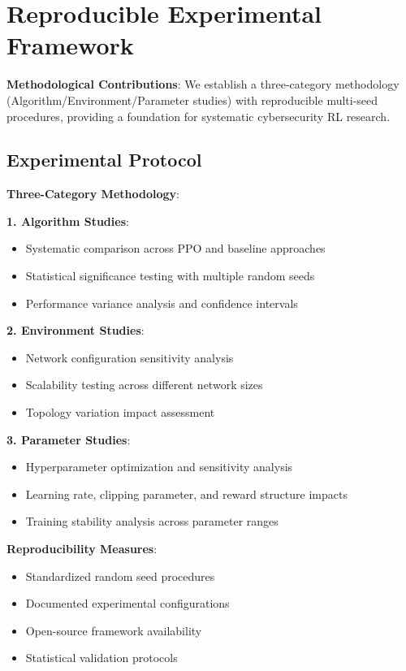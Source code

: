 \documentclass[11pt]{article}
\begin{document}
\section{Reproducible Experimental Framework}

\begin{research}
\textbf{Methodological Contributions}: We establish a three-category methodology (Algorithm/Environment/Parameter studies) with reproducible multi-seed procedures, providing a foundation for systematic cybersecurity RL research.
\end{research}

\subsection{Experimental Protocol}

\begin{mathdetails}
\textbf{Three-Category Methodology}:

\textbf{1. Algorithm Studies}:
\begin{itemize}
\item Systematic comparison across PPO and baseline approaches
\item Statistical significance testing with multiple random seeds
\item Performance variance analysis and confidence intervals
\end{itemize}

\textbf{2. Environment Studies}:
\begin{itemize}
\item Network configuration sensitivity analysis
\item Scalability testing across different network sizes
\item Topology variation impact assessment
\end{itemize}

\textbf{3. Parameter Studies}:
\begin{itemize}
\item Hyperparameter optimization and sensitivity analysis
\item Learning rate, clipping parameter, and reward structure impacts
\item Training stability analysis across parameter ranges
\end{itemize}

\textbf{Reproducibility Measures}:
\begin{itemize}
\item Standardized random seed procedures
\item Documented experimental configurations
\item Open-source framework availability
\item Statistical validation protocols
\end{itemize}
\end{mathdetails}
\end{document}
